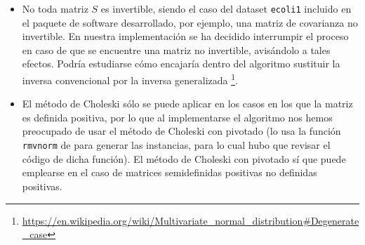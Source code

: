 \begin{itemize} 
 \item No toda matriz $S$ es invertible, siendo el caso del dataset \texttt{ecoli1} incluido en el paquete de software 
 desarrollado, por ejemplo, una matriz de covarianza no invertible. En nuestra implementación se ha decidido interrumpir
 el proceso en caso de que se encuentre una matriz no invertible, avisándolo a tales efectos. Podría estudiarse cómo encajaría
 dentro del algoritmo sustituir la inversa convencional por la inversa generalizada 
 \footnote{\url{https://en.wikipedia.org/wiki/Multivariate_normal_distribution\#Degenerate_case}}.

 \item El método de Choleski sólo se puede aplicar en los casos en los que la matriz es definida positiva, por lo que 
 al implementarse el algoritmo nos hemos preocupado de usar el método de Choleski con pivotado (lo usa la función \texttt{rmvnorm}
 de  para generar las instancias, para lo cual hubo que revisar el código de dicha función). El método
 de Choleski con pivotado sí que puede emplearse en el caso de matrices semidefinidas positivas no definidas positivas.
\end{itemize}

